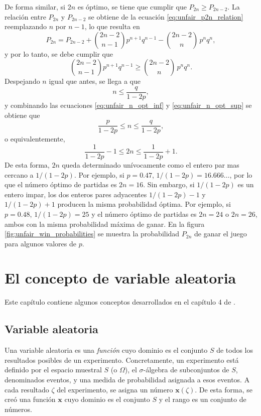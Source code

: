 \documentclass[a4paper]{report}
\newcommand{\x}{\mathbf{x}}
\begin{document}
De forma similar, si \(2n\) es óptimo, se tiene que cumplir que \(P_{2n}\geq P_{2n-2}\). La relación entre \(P_{2n}\) y \(P_{2n-2}\) se obtiene de la ecuación \ref{eq:unfair_p2n_relation} reemplazando \(n\) por \(n-1\), lo que resulta en
\[
 P_{2n}=P_{2n-2}+\binom{2n-2}{n-1}p^{n+1}q^{n-1}-\binom{2n-2}{n}\,p^{n}q^{n},
\]
y por lo tanto, se debe cumplir que
\[
 \binom{2n-2}{n-1}p^{n+1}q^{n-1}\geq \binom{2n-2}{n}\,p^{n}q^{n}.
\]
Despejando \(n\) igual que antes, se llega a que
\begin{equation}\label{eq:unfair_n_opt_sup}
 n\leq \frac{q}{1-2p},
\end{equation}
y combinando las ecuaciones \ref{eq:unfair_n_opt_inf} y \ref{eq:unfair_n_opt_sup} se obtiene que
\[
 \frac{p}{1-2p}\leq n\leq \frac{q}{1-2p},
\]
o equivalentemente,
\[
 \frac{1}{1-2p}-1\leq 2n\leq \frac{1}{1-2p}+1.
\]
De esta forma, \(2n\) queda determinado unívocamente como el entero par mas cercano a \(1/(1-2p)\). Por ejemplo, si \(p=0.47\), \(1/(1-2p)=16.666\dots\), por lo que el número óptimo de partidas es \(2n=16\). Sin embargo, si \(1/(1-2p)\) es un entero impar, los dos enteros pares adyacentes \(1/(1-2p)-1\) y \(1/(1-2p)+1\) producen la misma probabilidad óptima. Por ejemplo, si \(p=0.48\), \(1/(1-2p)=25\) y el número óptimo de partidas es \(2n=24\) o \(2n=26\), ambos con la misma probabilidad máxima de ganar. En la figura \ref{fig:unfair_win_probabilities} se muestra la probabilidad \(P_{2n}\) de ganar el juego para algunos valores de \(p\). 

\chapter{El concepto de variable aleatoria}

Este capítulo contiene algunos conceptos desarrollados en el capítulo 4 de \cite{papoulis2002probability}.

\section{Variable aleatoria}

Una variable aleatoria es una \emph{función} cuyo dominio es el conjunto \(S\) de todos los resultados posibles de un experimento. Concretamente, un experimento está definido por el espacio muestral \(S\) (o \(\Omega\)), el \(\sigma\)-álgebra de subconjuntos de \(S\), denominados eventos, y una medida de probabilidad asignada a esos eventos. A cada resultado \(\zeta\) del experimento, se asigna un número \(\x(\zeta)\). De esta forma, se creó una función \(\x\) cuyo dominio es el conjunto \(S\) y el rango es un conjunto de números.
\end{document}
